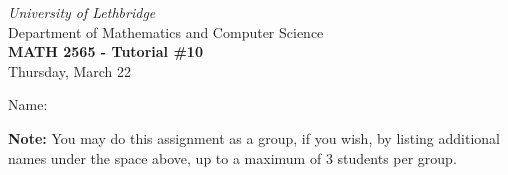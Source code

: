 \documentclass[12pt]{article}
\newcommand{\skipline}{\vspace{12pt}}
\begin{document}
\author{Instructor: Sean Fitzpatrick}
\thispagestyle{empty}
\begin{center}
\emph{University of Lethbridge}\\
Department of Mathematics and Computer Science\\
{\bf MATH 2565 - Tutorial \#10}\\
Thursday, March 22
\end{center}
\skipline \skipline \skipline \noindent \skipline

\skipline
Name:\underline{\hspace{348pt}}\\
\skipline

\vspace{10cm}

\textbf{Note:} You may do this assignment as a group, if you wish, by listing additional names under the space above, up to a maximum of 3 students per group.






\newpage
\end{document}
